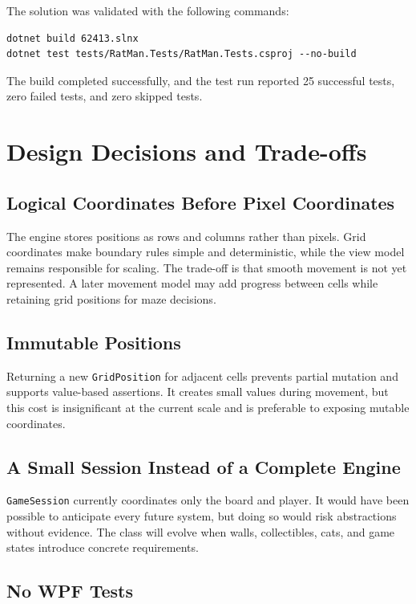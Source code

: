 The solution was validated with the following commands:

\begin{verbatim}
dotnet build 62413.slnx
dotnet test tests/RatMan.Tests/RatMan.Tests.csproj --no-build
\end{verbatim}

The build completed successfully, and the test run reported 25 successful tests, zero failed tests, and zero skipped tests.

\section{Design Decisions and Trade-offs}

\subsection{Logical Coordinates Before Pixel Coordinates}

The engine stores positions as rows and columns rather than pixels. Grid coordinates make boundary rules simple and deterministic, while the view model remains responsible for scaling. The trade-off is that smooth movement is not yet represented. A later movement model may add progress between cells while retaining grid positions for maze decisions.

\subsection{Immutable Positions}

Returning a new \texttt{GridPosition} for adjacent cells prevents partial mutation and supports value-based assertions. It creates small values during movement, but this cost is insignificant at the current scale and is preferable to exposing mutable coordinates.

\subsection{A Small Session Instead of a Complete Engine}

\texttt{GameSession} currently coordinates only the board and player. It would have been possible to anticipate every future system, but doing so would risk abstractions without evidence. The class will evolve when walls, collectibles, cats, and game states introduce concrete requirements.

\subsection{No WPF Tests}

